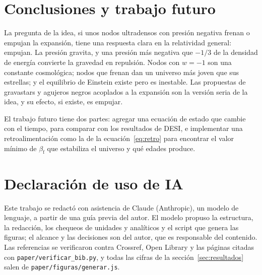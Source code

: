 \documentclass[11pt,a4paper]{article}
\begin{document}
\section{Conclusiones y trabajo futuro}\label{sec:conclusiones}

La pregunta de la idea, si unos nodos ultradensos con presión negativa frenan o empujan la expansión, tiene una respuesta clara en la relatividad general: empujan. La presión gravita, y una presión más negativa que $-1/3$ de la densidad de energía convierte la gravedad en repulsión. Nodos con $w = -1$ son una constante cosmológica; nodos que frenan dan un universo más joven que sus estrellas; y el equilibrio de Einstein existe pero es inestable. Las propuestas de gravastars y agujeros negros acoplados a la expansión son la versión seria de la idea, y su efecto, si existe, es empujar.

El trabajo futuro tiene dos partes: agregar una ecuación de estado que cambie con el tiempo, para comparar con los resultados de DESI, e implementar una retroalimentación como la de la ecuación~\eqref{eq:retro} para encontrar el valor mínimo de $\beta_{\mathrm f}$ que estabiliza el universo y qué edades produce.

\section*{Declaración de uso de IA}

Este trabajo se redactó con asistencia de Claude (Anthropic), un modelo de lenguaje, a partir de una guía previa del autor. El modelo propuso la estructura, la redacción, los chequeos de unidades y analíticos y el script que genera las figuras; el alcance y las decisiones son del autor, que es responsable del contenido. Las referencias se verificaron contra Crossref, Open Library y las páginas citadas con \texttt{paper/verificar\_bib.py}, y todas las cifras de la sección~\ref{sec:resultados} salen de \texttt{paper/figuras/generar.js}.

\printbibliography
\end{document}
